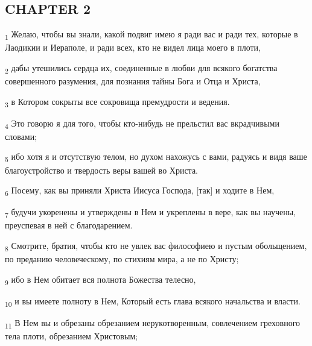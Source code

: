 \subsection{CHAPTER 2}
\begin{tcolorbox}
\textsubscript{1} Желаю, чтобы вы знали, какой подвиг имею я ради вас и ради тех, которые в Лаодикии и Иераполе, и ради всех, кто не видел лица моего в плоти,
\end{tcolorbox}
\begin{tcolorbox}
\textsubscript{2} дабы утешились сердца их, соединенные в любви для всякого богатства совершенного разумения, для познания тайны Бога и Отца и Христа,
\end{tcolorbox}
\begin{tcolorbox}
\textsubscript{3} в Котором сокрыты все сокровища премудрости и ведения.
\end{tcolorbox}
\begin{tcolorbox}
\textsubscript{4} Это говорю я для того, чтобы кто-нибудь не прельстил вас вкрадчивыми словами;
\end{tcolorbox}
\begin{tcolorbox}
\textsubscript{5} ибо хотя я и отсутствую телом, но духом нахожусь с вами, радуясь и видя ваше благоустройство и твердость веры вашей во Христа.
\end{tcolorbox}
\begin{tcolorbox}
\textsubscript{6} Посему, как вы приняли Христа Иисуса Господа, [так] и ходите в Нем,
\end{tcolorbox}
\begin{tcolorbox}
\textsubscript{7} будучи укоренены и утверждены в Нем и укреплены в вере, как вы научены, преуспевая в ней с благодарением.
\end{tcolorbox}
\begin{tcolorbox}
\textsubscript{8} Смотрите, братия, чтобы кто не увлек вас философиею и пустым обольщением, по преданию человеческому, по стихиям мира, а не по Христу;
\end{tcolorbox}
\begin{tcolorbox}
\textsubscript{9} ибо в Нем обитает вся полнота Божества телесно,
\end{tcolorbox}
\begin{tcolorbox}
\textsubscript{10} и вы имеете полноту в Нем, Который есть глава всякого начальства и власти.
\end{tcolorbox}
\begin{tcolorbox}
\textsubscript{11} В Нем вы и обрезаны обрезанием нерукотворенным, совлечением греховного тела плоти, обрезанием Христовым;
\end{tcolorbox}
